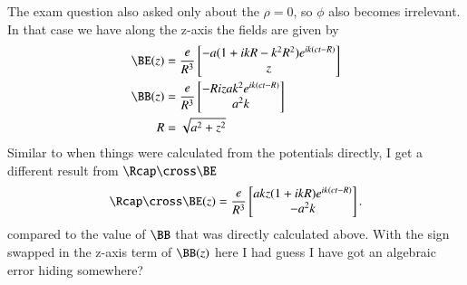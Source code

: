 {The exam question also asked only about the \(\rho = 0\), so \(\phi\) also becomes irrelevant.  In that case we have along the z-axis the fields are given by
%
\begin{equation}\label{eqn:relativisticElectrodynamicsExamReflection:1020}
\begin{aligned}
\BE(z)
&=
\frac{e}{R^3}
\begin{bmatrix}
- a (1 + i k R - k^2 R^2 ) e^{i k (c t - R)} \\
z
\end{bmatrix} \\
\BB(z)
&=
\frac{e}{R^3}
\begin{bmatrix}
-R i z a k^2 e^{i k (c t - R)} \\
a^2 k
\end{bmatrix} \\
R &= \sqrt{a^2 + z^2}
\end{aligned}
\end{equation}
%
Similar to when things were calculated from the potentials directly, I get a different result from \(\Rcap \cross \BE\)
%
\begin{equation}\label{eqn:relativisticElectrodynamicsExamReflection:1030}
\Rcap \cross \BE(z) = \frac{e}{R^3}
\begin{bmatrix}
a k z (1 + i k R) e^{i k (c t - R)} \\
-a^2 k
\end{bmatrix}.
\end{equation}
%
compared to the value of \(\BB\) that was directly calculated above.  With the sign swapped in the z-axis term of \(\BB(z)\) here I had guess I have got an algebraic error hiding somewhere?
} %
